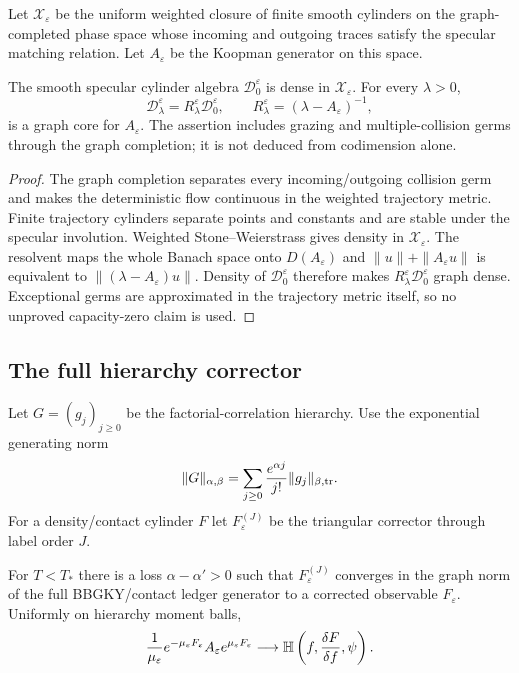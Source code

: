 Let $\mathcal X_\varepsilon$ be the uniform weighted closure of finite
smooth cylinders on the graph-completed phase space whose incoming and
outgoing traces satisfy the specular matching relation.  Let
$A_\varepsilon$ be the Koopman generator on this space.

\begin{theorem}
\label{thm:r13-b4-core}
The smooth specular cylinder algebra $\mathcal D_0^\varepsilon$ is dense in
$\mathcal X_\varepsilon$.  For every $\lambda>0$,
\[
 \mathcal D_\lambda^\varepsilon
 =R_\lambda^\varepsilon\mathcal D_0^\varepsilon,
 \qquad
 R_\lambda^\varepsilon=(\lambda-A_\varepsilon)^{-1},
\]
is a graph core for $A_\varepsilon$.  The assertion includes grazing and
multiple-collision germs through the graph completion; it is not deduced from
codimension alone.
\end{theorem}

\begin{proof}
The graph completion separates every incoming/outgoing collision germ and
makes the deterministic flow continuous in the weighted trajectory metric.
Finite trajectory cylinders separate points and constants and are stable
under the specular involution.  Weighted Stone--Weierstrass gives density in
$\mathcal X_\varepsilon$.  The resolvent maps the whole Banach space onto
$D(A_\varepsilon)$ and
$\|u\|+\|A_\varepsilon u\|$ is equivalent to
$\|(\lambda-A_\varepsilon)u\|$.  Density of
$\mathcal D_0^\varepsilon$ therefore makes
$R_\lambda^\varepsilon\mathcal D_0^\varepsilon$ graph dense.  Exceptional
germs are approximated in the trajectory metric itself, so no unproved
capacity-zero claim is used.
\end{proof}

\subsection{The full hierarchy corrector}

Let $G=(g_j)_{j\ge0}$ be the factorial-correlation hierarchy.  Use the
exponential generating norm
\[
 \|G\|_{\alpha,\beta}
 =\sum_{j\ge0}{e^{\alpha j}\over j!}
   \|g_j\|_{\beta,\rm tr}.
\]
For a density/contact cylinder $F$ let
$F_\varepsilon^{(J)}$ be the triangular corrector through label order $J$.

\begin{theorem}
\label{thm:r13-b4-corrector}
For $T<T_*$ there is a loss $\alpha-\alpha'>0$ such that
$F_\varepsilon^{(J)}$ converges in the graph norm of the full BBGKY/contact
ledger generator to a corrected observable $F_\varepsilon$.  Uniformly on
hierarchy moment balls,
\[
 {1\over\mu_\varepsilon}
 e^{-\mu_\varepsilon F_\varepsilon}
 A_\varepsilon e^{\mu_\varepsilon F_\varepsilon}
 \longrightarrow
 \mathbb H\left(f,{\delta F\over\delta f},\psi\right).
\]
\end{theorem}

